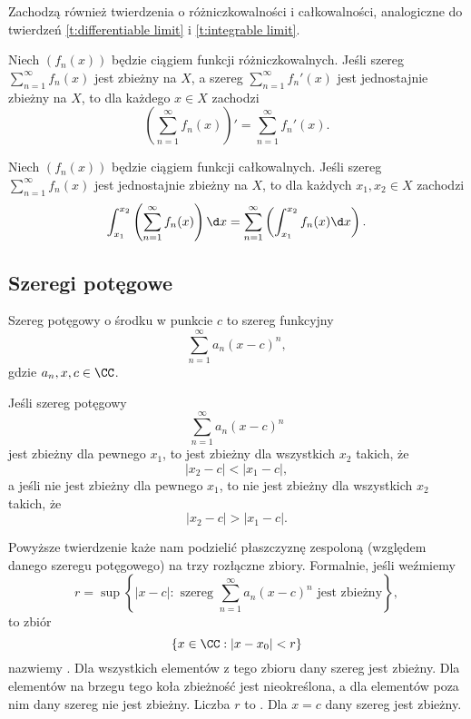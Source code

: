 Zachodzą również twierdzenia o różniczkowalności i całkowalności, analogiczne do twierdzeń \ref{t:differentiable limit} i \ref{t:integrable limit}.

\begin{theorem}
    \label{t:differentiable series}
    Niech $(f_n(x))$ będzie ciągiem funkcji różniczkowalnych. Jeśli szereg $\sum_{n=1}^\infty f_n(x)$ jest zbieżny na $X$, a szereg $\sum_{n=1}^\infty f_n'(x)$ jest jednostajnie zbieżny na $X$, to dla każdego $x \in X$ zachodzi
    \[ \left(\sum_{n=1}^\infty f_n(x)\right)' = \sum_{n=1}^\infty f_n'(x). \]
\end{theorem}

\begin{theorem}
    \label{t:integrable series}
    Niech $(f_n(x))$ będzie ciągiem funkcji całkowalnych. Jeśli szereg $\sum_{n=1}^\infty f_n(x)$ jest jednostajnie zbieżny na $X$, to dla każdych $x_1, x_2 \in X$ zachodzi
    \[ \int_{x_1}^{x_2}\left(\sum_{n=1}^\infty f_n(x)\right)\d x = \sum_{n=1}^\infty \left(\int_{x_1}^{x_2}f_n(x)\d x\right). \]
\end{theorem}

\subsection{Szeregi potęgowe}
\begin{definition}
    \label{d:power series}
    Szereg potęgowy o środku w punkcie $c$ to szereg funkcyjny
    \[ \sum_{n=1}^\infty a_n(x - c)^n, \]
    gdzie $a_n, x, c \in \CC$.
\end{definition}

\begin{theorem}
    Jeśli szereg potęgowy
    \[ \sum_{n=1}^\infty a_n(x - c)^n \]
    jest zbieżny dla pewnego $x_1$, to jest zbieżny dla wszystkich $x_2$ takich, że
    \[ |x_2 - c| < |x_1 - c|, \]
    a jeśli nie jest zbieżny dla pewnego $x_1$, to nie jest zbieżny dla wszystkich $x_2$ takich, że
    \[ |x_2 - c| > |x_1 - c|. \]
\end{theorem}

Powyższe twierdzenie każe nam podzielić płaszczyznę zespoloną (względem danego szeregu potęgowego) na trzy rozłączne zbiory. Formalnie, jeśli weźmiemy
\[ r = \sup\left\{|x - c| : \text{ szereg } \sum_{n=1}^\infty a_n(x - c)^n \text{ jest zbieżny}\right\}, \]
to zbiór
\[ \{x \in \CC : |x - x_0| < r\} \]
nazwiemy . Dla wszystkich elementów z tego zbioru dany szereg jest zbieżny. Dla elementów na brzegu tego koła zbieżność jest nieokreślona, a dla elementów poza nim dany szereg nie jest zbieżny. Liczba $r$ to . Dla $x=c$ dany szereg jest zbieżny.


